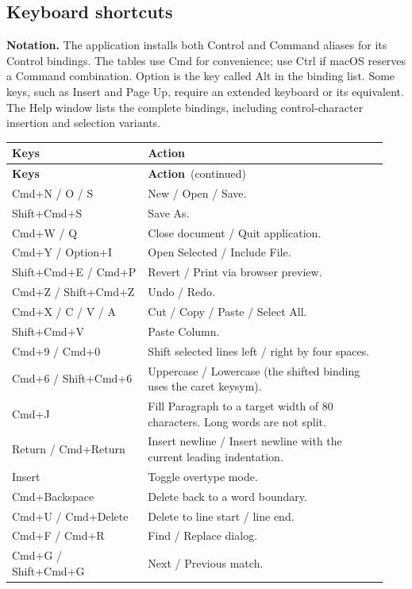 \documentclass[11pt,letterpaper]{article}
\newcommand{\key}[1]{\textsf{#1}}
\begin{document}
\subsection{Keyboard shortcuts}
\textbf{Notation.} The application installs both Control and Command aliases for
its Control bindings. The tables use \key{Cmd} for convenience; use \key{Ctrl}
if macOS reserves a Command combination. \key{Option} is the key called
\key{Alt} in the binding list. Some keys, such as Insert and Page Up, require an
extended keyboard or its equivalent. The Help window lists the complete bindings,
including control-character insertion and selection variants.

\begin{longtable}{@{}P{0.34\linewidth}P{0.60\linewidth}@{}}
\toprule\textbf{Keys} & \textbf{Action}\\\midrule\endfirsthead
\toprule\textbf{Keys} & \textbf{Action}\ (continued)\\\midrule\endhead
Cmd+N / O / S & New / Open / Save.\\
Shift+Cmd+S & Save As.\\
Cmd+W / Q & Close document / Quit application.\\
Cmd+Y / Option+I & Open Selected / Include File.\\
Shift+Cmd+E / Cmd+P & Revert / Print via browser preview.\\
Cmd+Z / Shift+Cmd+Z & Undo / Redo.\\
Cmd+X / C / V / A & Cut / Copy / Paste / Select All.\\
Shift+Cmd+V & Paste Column.\\
Cmd+9 / Cmd+0 & Shift selected lines left / right by four spaces.\\
Cmd+6 / Shift+Cmd+6 & Uppercase / Lowercase (the shifted binding uses the caret keysym).\\
Cmd+J & Fill Paragraph to a target width of 80 characters. Long words are not split.\\
Return / Cmd+Return & Insert newline / Insert newline with the current leading indentation.\\
Insert & Toggle overtype mode.\\
Cmd+Backspace & Delete back to a word boundary.\\
Cmd+U / Cmd+Delete & Delete to line start / line end.\\
\midrule
Cmd+F / Cmd+R & Find / Replace dialog.\\
Cmd+G / Shift+Cmd+G & Next / Previous match.\\

\end{longtable}
\end{document}

